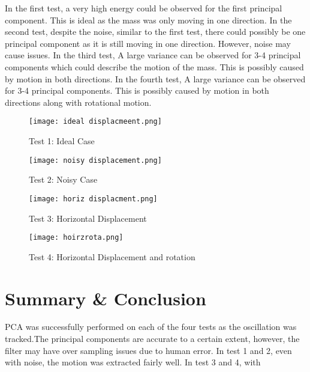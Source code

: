 \documentclass[a4paper,12pt]{article}
\begin{document}
In the first test, a very high energy could be observed for the first principal component. This is ideal as the mass was only moving in one direction. \newline \indent
In the second test, despite the noise, similar to the first test, there could possibly be one principal component as it is still moving in one direction. However, noise may cause issues. \newline\indent 
In the third test, A large variance can be observed for 3-4 principal components which could describe the motion of the mass. This is possibly caused by motion in both directions.
\newline
\indent In the fourth test, A large variance can be observed for 3-4 principal components. This is possibly caused by motion in both directions along with rotational motion.
\begin{figure}[!h]
	
	\begin{minipage}[t]{7 cm}
		\centering
		\texttt{[image: ideal displacmeent.png]}
		\caption{Test 1: Ideal Case}
	\end{minipage}
	\hspace{1cm}
	\begin{minipage}[t]{7 cm}
		\centering
		\texttt{[image: noisy displacement.png]}
		\caption{Test 2: Noisy Case}
	\end{minipage}
\end{figure}
\begin{figure}
	
	\begin{minipage}[t]{7cm}
		\centering
		\texttt{[image: horiz displacment.png]}
		\caption{Test 3: Horizontal Displacement}
	\end{minipage}
	\hspace{1cm}
	\begin{minipage}[t]{7cm}
		\centering
		\texttt{[image: hoirzrota.png]}
		\caption{Test 4: Horizontal Displacement and rotation}
	\end{minipage}
\end{figure}
\newpage

\section{Summary \& Conclusion }
PCA was successfully performed on each of the four tests as the oscillation was tracked.The principal components are accurate to a certain extent, however, the filter may have over sampling issues due to human error. In test 1 and 2, even with noise, the motion was extracted fairly well. In test 3 and 4, with 
\end{document}
